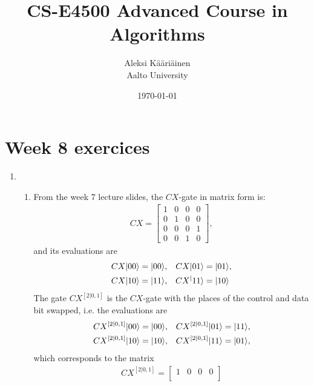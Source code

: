 \documentclass[11pt,a4paper]{article}
\title{CS-E4500 Advanced Course in Algorithms}
\author{Aleksi Kääriäinen  \\
	Aalto University  \\
	}
\begin{document}
\date{\today}

\maketitle

\newpage

\section*{Week 8 exercices}

\begin{enumerate}
    \item \begin{enumerate}
              \item From the week 7 lecture slides, the $CX$-gate in matrix form is:
                    \begin{align*}
                        CX = \begin{bmatrix}
                                 1 & 0 & 0 & 0 \\
                                 0 & 1 & 0 & 0 \\
                                 0 & 0 & 0 & 1 \\
                                 0 & 0 & 1 & 0
                             \end{bmatrix},
                    \end{align*}
                    and its evaluations are
                    \begin{align*}
                        CX|00\rangle & = |00\rangle, & CX|01\rangle  & = |01\rangle, \\
                        CX|10\rangle & = |11\rangle, & CX^|11\rangle & = |10\rangle
                    \end{align*}
                    The gate $CX^{[2|0, 1]}$ is the $CX$-gate with the places of the control and data bit swapped, i.e. the evaluations are
                    \begin{align*}
                        CX^{[2|0, 1]}|00\rangle & = |00\rangle, & CX^{[2|0, 1]}|01\rangle & = |11\rangle, \\
                        CX^{[2|0, 1]}|10\rangle & = |10\rangle, & CX^{[2|0, 1]}|11\rangle & = |01\rangle,
                    \end{align*} which corresponds to the matrix
                    \begin{align*}
                        CX^{[2|0, 1]} = \begin{bmatrix}
                                            1 & 0 & 0 & 0 \\

\end{bmatrix}
\end{align*}
\end{enumerate}
\end{enumerate}
\end{document}
